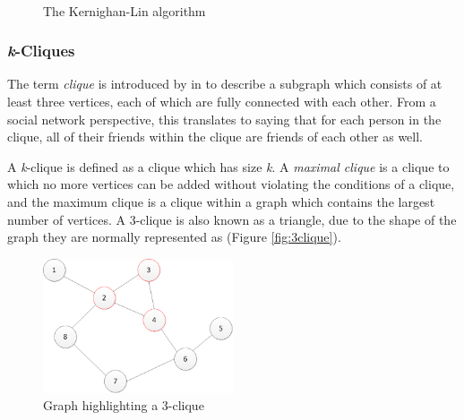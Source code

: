 \begin{figure}[htbp]
  \centering
  ~ 
  ~ 
  \caption{The Kernighan-Lin algorithm \cite{newman10}}
  \label{fig:kernighanlin}
\end{figure}

\subsubsection{\emph{k}-Cliques}
The term \emph{clique} is introduced by \citeauthor{luce49} in \cite{luce49} to describe a subgraph which consists of at least three vertices, each of which are fully connected with each other. From a social network perspective, this translates to saying that for each person in the clique, all of their friends  within the clique are friends of each other as well.

A \emph{k}-clique is defined as a clique which has size \emph{k}. A \emph{maximal clique} is a clique to which no more vertices can be added without violating the conditions of a clique, and the maximum clique is a clique within a graph which contains the largest number of vertices. A 3-clique is also known as a triangle, due to the shape of the graph they are normally represented as (Figure \ref{fig:3clique}).

\begin{figure}[htbp]
\centering
\includegraphics[width=0.5\textwidth]{./img/clique.png}
\caption{Graph highlighting a 3-clique}
\label{fig:clique}
\end{figure}

